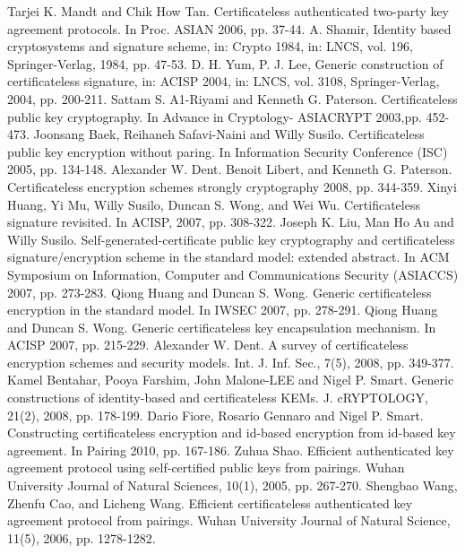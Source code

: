 \documentclass[final,1p,times,twocolumn]{elsarticle}
\begin{document}
\begin{thebibliography}{99}

 Tarjei K. Mandt and Chik How Tan. Certificateless authenticated two-party key agreement protocols. In Proc. ASIAN 2006, pp. 37-44.
 A. Shamir, Identity based cryptosystems and signature scheme, in: Crypto 1984, in: LNCS, vol. 196, Springer-Verlag, 1984, pp. 47-53.
 D. H. Yum, P. J. Lee, Generic construction of certificateless signature, in: ACISP 2004, in: LNCS, vol. 3108, Springer-Verlag, 2004, pp. 200-211.
Sattam S. A1-Riyami and Kenneth G. Paterson. Certificateless public key cryptography. In Advance in Cryptology- ASIACRYPT 2003,pp. 452-473.
Joonsang Baek, Reihaneh Safavi-Naini and Willy Susilo. Certificateless public key encryption without paring. In Information Security Conference (ISC) 2005, pp. 134-148.
 Alexander W. Dent. Benoit Libert, and Kenneth G. Paterson. Certificateless encryption schemes strongly cryptography 2008, pp. 344-359.
 Xinyi Huang, Yi Mu, Willy Susilo, Duncan S. Wong, and Wei Wu. Certificateless signature revisited. In ACISP, 2007, pp. 308-322.
 Joseph K. Liu, Man Ho Au and Willy Susilo. Self-generated-certificate public key cryptography and certificateless signature/encryption scheme in the standard model: extended abstract. In ACM Symposium on Information, Computer and Communications Security (ASIACCS) 2007, pp. 273-283.
 Qiong Huang and Duncan S. Wong. Generic certificateless encryption in the standard model. In IWSEC 2007, pp. 278-291.
 Qiong Huang and Duncan S. Wong. Generic certificateless key encapsulation mechanism. In ACISP 2007, pp. 215-229.
 Alexander W. Dent. A survey of certificateless encryption schemes and security models. Int. J. Inf. Sec., 7(5), 2008, pp. 349-377.
 Kamel Bentahar, Pooya Farshim, John Malone-LEE and Nigel P. Smart. Generic constructions of identity-based and certificateless KEMs. J. cRYPTOLOGY, 21(2), 2008, pp. 178-199.
 Dario Fiore, Rosario Gennaro and Nigel P. Smart. Constructing certificateless encryption and id-based encryption from id-based key agreement. In Pairing 2010, pp. 167-186.
 Zuhua Shao. Efficient authenticated key agreement protocol using self-certified public keys from pairings. Wuhan University Journal of Natural Sciences, 10(1), 2005, pp. 267-270.
 Shengbao Wang, Zhenfu Cao, and Licheng Wang. Efficient certificateless authenticated key agreement protocol from pairings. Wuhan University Journal of Natural Science, 11(5), 2006, pp. 1278-1282.

\end{thebibliography}
\end{document}

